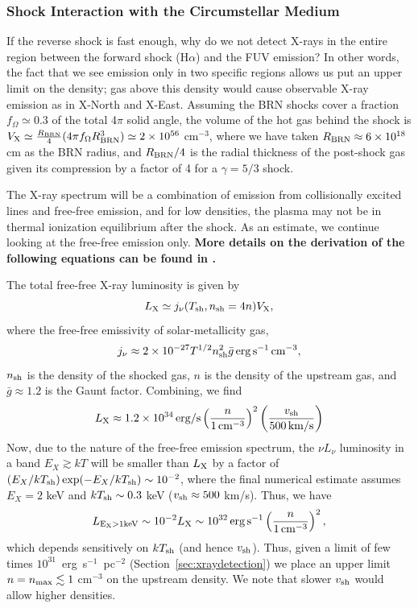 \documentclass[linenumbers]{aastex631}
\newcommand{\be}{\begin{equation}}
\newcommand{\ee}{\end{equation}}
\begin{document}
\subsubsection{Shock Interaction with the Circumstellar Medium}
\label{sec:ISM}
If the reverse shock is fast enough, why do we not detect X-rays in the entire region between the forward shock (H$\alpha$) and the FUV emission? In other words, the fact that we see emission only in two specific regions allows us put an upper limit on the density; gas above this density would cause observable X-ray emission as in X-North and X-East.
Assuming the BRN shocks cover a fraction $f_{\Omega} \simeq 0.3$ of the total 4$\pi$ solid angle,  the volume of the hot gas behind the shock is $V_{\rm X} \simeq \frac{R_{\rm BRN}}{4}(4\pi f_{\Omega} R_{\rm BRN}^{3}) \simeq 2\times 10^{56}$ cm$^{-3}$, where we have taken $R_{\rm BRN} \approx 6\times 10^{18}$ cm as the BRN radius, and $R_{\rm BRN}/4$ is the radial thickness of the post-shock gas given its compression by a factor of 4 for a $\gamma = 5/3$ shock.

The X-ray spectrum will be a combination of emission from collisionally excited lines and free-free emission, and for low densities, the plasma may not be in thermal ionization equilibrium after the shock. As an estimate, we continue looking at the free-free emission only. \textbf{More details on the derivation of the following equations can be found in \citet{1986rpa..book.....R}.}

The total free-free X-ray luminosity is given by
\be
L_{\rm X} \simeq j_{\nu}(T_{\rm sh},n_{\rm sh} = 4 n)V_{\rm X},
\ee
where the free-free emissivity of solar-metallicity gas,
\be
j_{\nu} \approx 2\times 10^{-27}T^{1/2}n_{\rm sh}^{2}\bar{g}\,{\rm erg\,s^{-1}\,cm^{-3}},
\ee
$n_{\rm sh}$ is the density of the shocked gas, $n$ is the density of the upstream gas, and $\bar{g} \approx 1.2$ is the Gaunt factor.  Combining, we find
\be
L_{\rm X} \approx 1.2\times 10^{34}\,{\rm erg/s}\left(\frac{n}{1\,{\rm cm^{-3}}}\right)^{2}\left(\frac{v_{\rm sh}}{500\,{\rm km/s}}\right)
\ee
Now, due to the nature of the free-free emission spectrum, the $\nu L_{\nu}$ luminosity in a band $E_X \gtrsim kT$ will be smaller than $L_{\rm X}$ by a factor of $(E_X/kT_{\rm sh})\exp(-E_X/kT_{\rm sh}) \sim 10^{-2}$, where the final numerical estimate assumes $E_X = 2$ keV and $kT_{\rm sh} \sim 0.3$ keV ($v_{\rm sh} \approx 500$ km/s).  Thus, we have
\be
L_{\rm E_X > 1 keV} \sim 10^{-2}L_{\rm X} \sim 10^{32}\,{\rm erg\,s^{-1}}\left(\frac{n}{1\,{\rm cm^{-3}}}\right)^{2},
\ee
which depends sensitively on $kT_{\rm sh}$ (and hence $v_{\rm sh}$).  Thus, given a limit
of few times $10^{31}$~erg~s$^{-1}$~pc$^{-2}$ (Section~\ref{sec:xraydetection})
we place an upper limit $n = n_{\rm max} \lesssim 1$ cm$^{-3}$ on the upstream density. We note that slower $v_{\rm sh}$ would allow higher densities.
\end{document}
